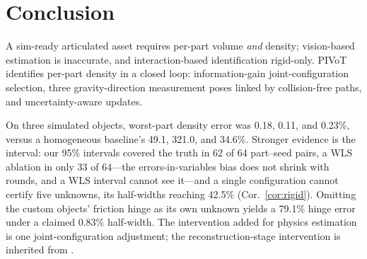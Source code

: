 \section{Conclusion}

A sim-ready articulated asset requires per-part volume \emph{and} density;
vision-based estimation is inaccurate, and interaction-based identification
rigid-only. PIVoT identifies per-part density in a closed loop:
information-gain joint-configuration selection, three gravity-direction
measurement poses linked by collision-free paths, and uncertainty-aware
updates.

On three simulated objects, worst-part density error was 0.18, 0.11, and
0.23\%, versus a homogeneous baseline's 49.1, 321.0, and 34.6\%. Stronger
evidence is the interval: our 95\% intervals covered the truth in 62 of 64
part--seed pairs, a WLS ablation in only 33 of 64---the errors-in-variables
bias does not shrink with rounds, and a WLS interval cannot see it---and a
single configuration cannot certify five unknowns, its half-widths reaching
42.5\% (Cor.~\ref{cor:rigid}). Omitting the custom objects' friction hinge
as its own unknown yields a 79.1\% hinge error under a claimed 0.83\%
half-width. The intervention added for physics estimation is one
joint-configuration adjustment; the reconstruction-stage intervention is
inherited from \cite{lee2026rora}. 

